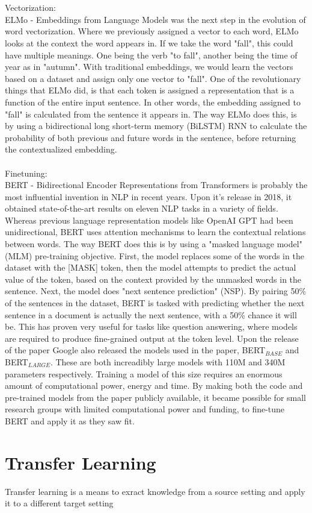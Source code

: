 \documentclass{report}
\begin{document}
\\\\
\noindent
Vectorization:\\
ELMo - Embeddings from Language Models was the next step in the evolution of word vectorization. Where we previously assigned a vector to each word, ELMo looks at the context the word appears in. If we take the word "fall", this could have multiple meanings. One being the verb "to fall", another being the time of year as in "autumn". With traditional embeddings, we would learn the vectors based on a dataset and assign only one vector to "fall". One of the revolutionary things that ELMo did, is that each token is assigned a representation that is a function of the entire input sentence. In other words, the embedding assigned to "fall" is calculated from the sentence it appears in. The way ELMo does this, is by using a bidirectional long short-term memory (BiLSTM) RNN to calculate the probability of both previous and future words in the sentence, before returning the contextualized embedding.
\\\\
Finetuning:\\
BERT - Bidirectional Encoder Representations from Transformers is probably the most influential invention in NLP in recent years. Upon it's release in 2018, it obtained state-of-the-art results on eleven NLP tasks in a variety of fields. Whereas previous language representation models like OpenAI GPT had been unidirectional, BERT uses attention mechanisms to learn the contextual relations between words. The way BERT does this is by using a "masked language model" (MLM) pre-training objective. First, the model replaces some of the words in the dataset with the [MASK] token, then the model attempts to predict the actual value of the token, based on the context provided by the unmasked words in the sentence. Next, the model does "next sentence prediction" (NSP). By pairing 50\% of the sentences in the dataset, BERT is tasked with predicting whether the next sentence in a document is actually the next sentence, with a 50\% chance it will be. This has proven very useful for tasks like question answering, where models are required to produce fine-grained output at the token level. Upon the release of the paper Google also released the models used in the paper, BERT$_{BASE}$ and BERT$_{LARGE}$. These are both increadibly large models with 110M and 340M parameters respectively. Training a model of this size requires an enormous amount of computational power, energy and time. By making both the code and pre-trained models from the paper publicly available, it became possible for small research groups with limited computational power and funding, to fine-tune BERT and apply it as they saw fit.
\section{Transfer Learning}
Transfer learning is a means to exract knowledge from a source setting and apply it to a different target setting
\end{document}
